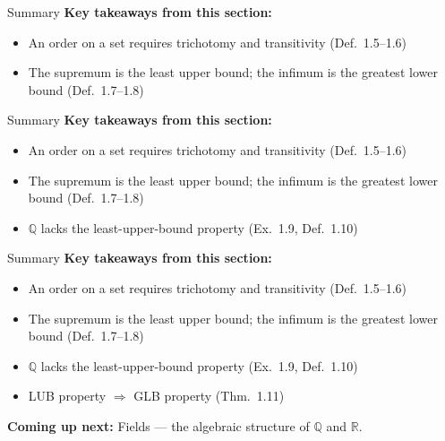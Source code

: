 \documentclass[aspectratio=169,12pt,t]{beamer}
\begin{document}
\begin{frame}{Summary}
  \textbf{Key takeaways from this section:}
  \begin{itemize}
    \item An \alert{order} on a set requires trichotomy and transitivity (Def.\ 1.5--1.6)
    \item The \alert{supremum} is the least upper bound; the \alert{infimum} is the greatest lower bound (Def.\ 1.7--1.8)
  \end{itemize}

\end{frame}

\begin{frame}{Summary}
  \textbf{Key takeaways from this section:}
  \begin{itemize}
    \item An \alert{order} on a set requires trichotomy and transitivity (Def.\ 1.5--1.6)
    \item The \alert{supremum} is the least upper bound; the \alert{infimum} is the greatest lower bound (Def.\ 1.7--1.8)
    \item $\mathbb{Q}$ lacks the \alert{least-upper-bound property} (Ex.\ 1.9, Def.\ 1.10)
  \end{itemize}

\end{frame}

\begin{frame}{Summary}
  \textbf{Key takeaways from this section:}
  \begin{itemize}
    \item An \alert{order} on a set requires trichotomy and transitivity (Def.\ 1.5--1.6)
    \item The \alert{supremum} is the least upper bound; the \alert{infimum} is the greatest lower bound (Def.\ 1.7--1.8)
    \item $\mathbb{Q}$ lacks the \alert{least-upper-bound property} (Ex.\ 1.9, Def.\ 1.10)
    \item LUB property $\Longrightarrow$ GLB property (Thm.\ 1.11)
  \end{itemize}

  \vspace{1em}
  \textbf{Coming up next:} Fields --- the algebraic structure of $\mathbb{Q}$ and $\mathbb{R}$.

\end{frame}
\end{document}

